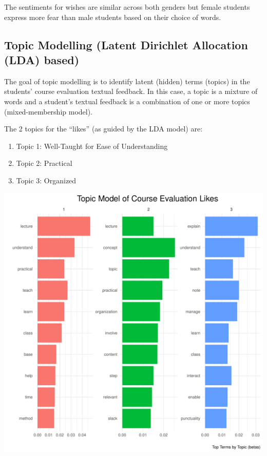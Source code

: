 \documentclass[
]{article}
\begin{document}
The sentiments for wishes are similar across both genders but female
students express more fear than male students based on their choice of
words.

\newpage

\subsection{Topic Modelling (Latent Dirichlet Allocation (LDA)
based)}\label{topic-modelling-latent-dirichlet-allocation-lda-based}

The goal of topic modelling is to identify latent (hidden) terms
(topics) in the students' course evaluation textual feedback. In this
case, a topic is a mixture of words and a student's textual feedback is
a combination of one or more topics (mixed-membership model).

The 2 topics for the ``likes'' (as guided by the LDA model) are:

\begin{enumerate}
\def\labelenumi{\arabic{enumi}.}
\item
  Topic 1: Well-Taught for Ease of Understanding
\item
  Topic 2: Practical
\item
  Topic 3: Organized
\end{enumerate}

\includegraphics{Mid-SemesterCourseEvaluation-20240819-20241125-ADB-BBIT2.2_files/figure-latex/visualizations_for_likes_topic_modelling-1.pdf}
\end{document}
